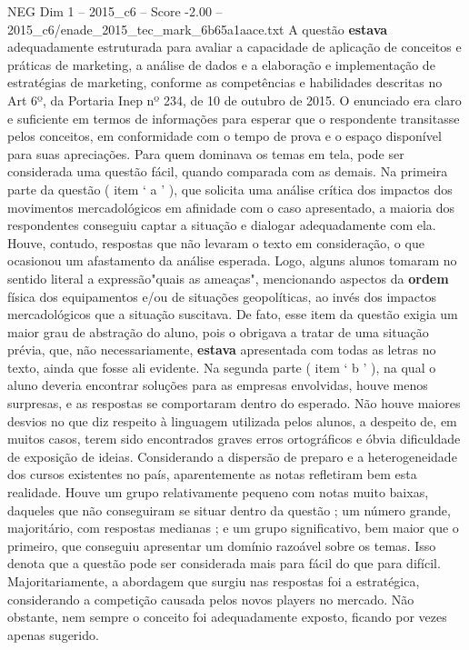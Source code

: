 \begin{textsample}{NEG Dim 1 – 2015\_c6 – Score -2.00 – 2015\_c6/enade\_2015\_tec\_mark\_6b65a1aace.txt}
A questão \textbf{estava} adequadamente estruturada para avaliar a capacidade de aplicação de conceitos e práticas de marketing, a análise de dados e a elaboração e implementação de estratégias de marketing, conforme as competências e habilidades descritas no Art 6º, da Portaria Inep nº 234, de 10 de outubro de 2015.
O enunciado era claro e suficiente em termos de informações para esperar que o respondente transitasse pelos conceitos, em conformidade com o tempo de prova e o espaço disponível para suas apreciações.
Para quem dominava os temas em tela, pode ser considerada uma questão fácil, quando comparada com as demais.
Na primeira parte da questão ( item ‘ a ’ ), que solicita uma análise crítica dos impactos dos movimentos mercadológicos em afinidade com o caso apresentado, a maioria dos respondentes conseguiu captar a situação e dialogar adequadamente com ela.
Houve, contudo, respostas que não levaram o texto em consideração, o que ocasionou um afastamento da análise esperada.
Logo, alguns alunos tomaram no sentido literal a expressão"quais as ameaças", mencionando aspectos da \textbf{ordem} física dos equipamentos e/ou de situações geopolíticas, ao invés dos impactos mercadológicos que a situação suscitava.
De fato, esse item da questão exigia um maior grau de abstração do aluno, pois o obrigava a tratar de uma situação prévia, que, não necessariamente, \textbf{estava} apresentada com todas as letras no texto, ainda que fosse ali evidente.
Na segunda parte ( item ‘ b ’ ), na qual o aluno deveria encontrar soluções para as empresas envolvidas, houve menos surpresas, e as respostas se comportaram dentro do esperado.
Não houve maiores desvios no que diz respeito à linguagem utilizada pelos alunos, a despeito de, em muitos casos, terem sido encontrados graves erros ortográficos e óbvia dificuldade de exposição de ideias.
Considerando a dispersão de preparo e a heterogeneidade dos cursos existentes no país, aparentemente as notas refletiram bem esta realidade.
Houve um grupo relativamente pequeno com notas muito baixas, daqueles que não conseguiram se situar dentro da questão ; um número grande, majoritário, com respostas medianas ; e um grupo significativo, bem maior que o primeiro, que conseguiu apresentar um domínio razoável sobre os temas.
Isso denota que a questão pode ser considerada mais para fácil do que para difícil.
Majoritariamente, a abordagem que surgiu nas respostas foi a estratégica, considerando a competição causada pelos novos players no mercado.
Não obstante, nem sempre o conceito foi adequadamente exposto, ficando por vezes apenas sugerido.

\end{textsample}
